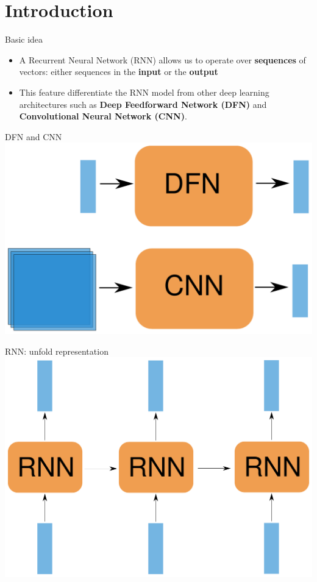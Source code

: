 \documentclass[10pt]{beamer}
\begin{document}
\nocite{DeepLearningbook}


\maketitle

\section{Introduction}

\begin{frame}[fragile]{Basic idea}
\begin{itemize}
\item A \alert{Recurrent Neural Network (RNN)} allows us to operate over \textbf{sequences} of vectors: either sequences in the \textbf{input} or the \textbf{output} 
\vspace{0.5cm}
\item This feature differentiate the RNN model from other deep learning architectures such as \textbf{Deep Feedforward Network (DFN)} and \textbf{Convolutional Neural Network (CNN)}.
\end{itemize}
\end{frame}

\begin{frame}[fragile]{DFN and CNN}
\includegraphics[scale=0.5]{images/DfnCnn.pdf}
\end{frame}

\begin{frame}[fragile]{RNN: unfold representation}
\includegraphics[scale=0.5]{images/RNNnaive1.pdf}
\end{frame}
\end{document}
